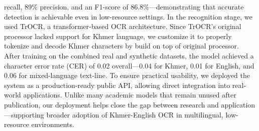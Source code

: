\begin{adjustwidth}{0.2cm}{0.2cm}
    recall, 89\% precision, and an F1-score of 86.8\%—demonstrating 
    that accurate detection is achievable even in low-resource 
    settings. In the recognition stage, we used TrOCR, a transformer-based 
    OCR architecture. Since TrOCR’s original processor lacked 
    support for Khmer language, we customize it to properly tokenize 
    and decode Khmer characters by build on top of original 
    processor. After training on the combined real and synthetic 
    datasets, the model achieved a character error rate (CER) of 
    0.02 overall—0.04 for Khmer, 0.01 for English, and 0.06 for 
    mixed-language text-line. To ensure practical usability, we deployed the system as a 
    production-ready public API, allowing direct integration into 
    real-world applications. Unlike many academic models that 
    remain unused after publication, our deployment helps close 
    the gap between research and application—supporting broader 
    adoption of Khmer-English OCR in multilingual, low-resource 
    environments.



    
    \end{adjustwidth}